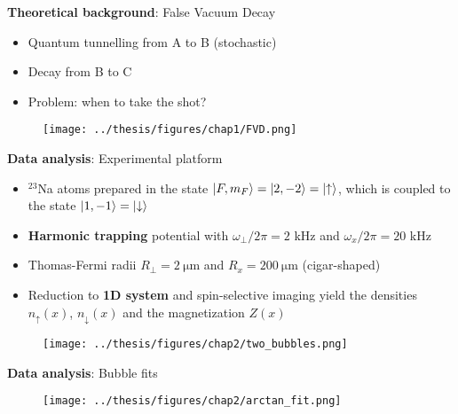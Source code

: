 \documentclass[aspectratio=169]{beamer}
\begin{document}
\begin{frame}{\textbf{Theoretical background}: False Vacuum Decay}
  \begin{minipage}{0.32\textwidth}
    \begin{itemize}
      \item Quantum tunnelling from A to B (stochastic)
      \item Decay from B to C
      \item Problem: when to take the shot?
    \end{itemize}
  \end{minipage}
  \hspace{0.01\textwidth}
  \begin{minipage}{0.65\textwidth}
    \begin{figure}
      \centering
      \texttt{[image: ../thesis/figures/chap1/FVD.png]}
    \end{figure} 
  \end{minipage}
\end{frame}

\begin{frame}{\textbf{Data analysis}: Experimental platform}
  \begin{itemize}
    \item $^{23}$Na atoms prepared in the state $\ket{F,m_F} = \ket{2, -2} = \ket{\uparrow}$, which is coupled to the state $\ket{1, -1} = \ket{\downarrow}$
    \item \textbf{Harmonic trapping} potential with $\omega_\perp/2\pi = 2$ \unit{\kilo\hertz} and $\omega_x/2\pi = 20$ \unit{\kilo\hertz}
    \item Thomas-Fermi radii $R_\perp = 2\ \unit{\micro\meter}$ and $R_x = 200\ \unit{\micro\meter}$ (cigar-shaped)
    \item Reduction to \textbf{1D system} and spin-selective imaging yield the densities $n_\uparrow(x)$, $n_\downarrow(x)$ and the magnetization $Z(x)$
  \end{itemize}  
  \pause
  \begin{figure}
    \centering
    \texttt{[image: ../thesis/figures/chap2/two\_bubbles.png]}
  \end{figure}
\end{frame}

\begin{frame}{\textbf{Data analysis}: Bubble fits}
  \begin{figure}
      \centering
      \texttt{[image: ../thesis/figures/chap2/arctan\_fit.png]}
  \end{figure}
\end{frame}
\end{document}
